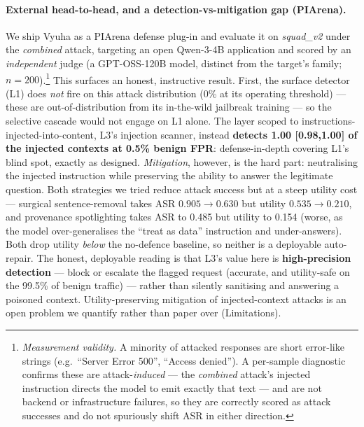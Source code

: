 \documentclass[11pt]{article}
\begin{document}
\paragraph{External head-to-head, and a detection-vs-mitigation gap (PIArena).} We ship Vyuha as a
PIArena \citep{piarena} defense plug-in and evaluate it on \emph{squad\_v2} under the \emph{combined}
attack, targeting an open Qwen-3-4B application and scored by an \emph{independent} judge (a
GPT-OSS-120B model, distinct from the target's family; $n{=}200$).\footnote{\emph{Measurement
validity.} A minority of attacked responses are short error-like strings (e.g.\ ``Server Error 500'',
``Access denied''). A per-sample diagnostic confirms these are attack-\emph{induced} --- the
\emph{combined} attack's injected instruction directs the model to emit exactly that text --- and are
not backend or infrastructure failures, so they are correctly scored as attack successes and do not
spuriously shift ASR in either direction.} This surfaces an honest,
instructive result. First, the surface detector (L1) does \emph{not} fire on this attack distribution
(0\% at its operating threshold) --- these are out-of-distribution from its in-the-wild jailbreak
training --- so the selective cascade would not engage on L1 alone. The layer scoped to
instructions-injected-into-content, L3's injection scanner, instead \textbf{detects 1.00 [0.98,1.00] of
the injected contexts at 0.5\% benign FPR}: defense-in-depth covering L1's blind spot, exactly as
designed. \emph{Mitigation}, however, is the hard part: neutralising the injected instruction while
preserving the ability to answer the legitimate question. Both strategies we tried reduce attack
success but at a steep utility cost --- surgical sentence-removal takes ASR $0.905\!\to\!0.630$ but
utility $0.535\!\to\!0.210$, and provenance spotlighting takes ASR to 0.485 but utility to 0.154
(worse, as the model over-generalises the ``treat as data'' instruction and under-answers). Both drop
utility \emph{below} the no-defence baseline, so neither is a deployable auto-repair. The honest,
deployable reading is that L3's value here is \textbf{high-precision detection} --- block or escalate
the flagged request (accurate, and utility-safe on the 99.5\% of benign traffic) --- rather than
silently sanitising and answering a poisoned context. Utility-preserving mitigation of injected-context
attacks is an open problem we quantify rather than paper over (Limitations).
\end{document}
